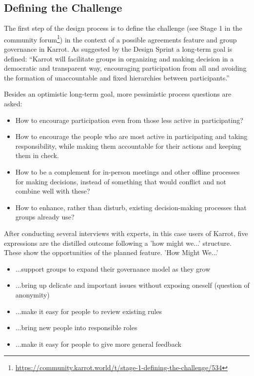\documentclass[
	a4paper,%
	11pt,%
	]{article}
\begin{document}
\subsection{Defining the Challenge}\label{subsec:challenge}

The first step of the design process is to define the challenge (see Stage 1 in the community forum\footnote{\label{url:1challenge}\url{https://community.karrot.world/t/stage-1-defining-the-challenge/534}}) in the context of a possible agreements feature and group governance in Karrot. As suggested by the Design Sprint a long-term goal is defined: “Karrot will facilitate groups in organizing and making decision in a democratic and transparent way, encouraging participation from all and avoiding the formation of unaccountable and fixed hierarchies between participants.”

Besides an optimistic long-term goal, more pessimistic process questions are asked:
\begin{itemize}
	\item How to encourage participation even from those less active in participating?
	\item How to encourage the people who are most active in participating and taking responsibility, while making them accountable for their actions and keeping them in check.
	\item How to be a complement for in-person meetings and other offline processes for making decisions, instead of something that would conflict and not combine well with these?
	\item How to enhance, rather than disturb, existing decision-making processes that groups already use?
\end{itemize}

After conducting several interviews with experts, in this case users of Karrot, five expressions are the distilled outcome following a 'how might we...' structure. These show the opportunities of the planned feature. 'How Might We...'
\begin{itemize}
	\item ...support groups to expand their governance model as they grow
	\item ...bring up delicate and important issues without exposing oneself (question of anonymity)
	\item ...make it easy for people to review existing rules
	\item ...bring new people into responsible roles
	\item ...make it easy for people to give more general feedback
\end{itemize}
\end{document}
